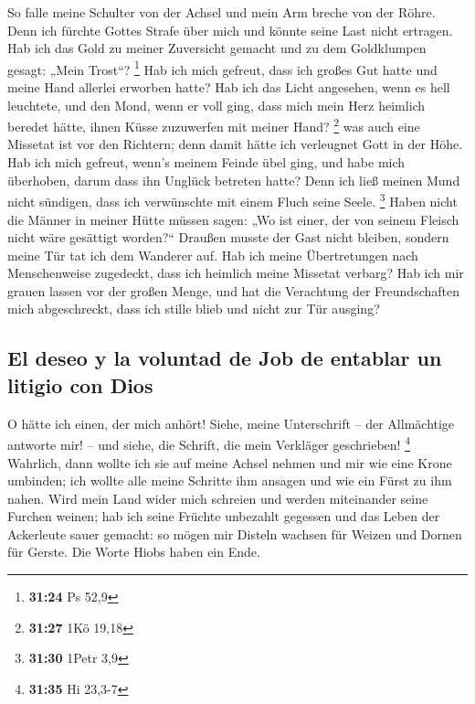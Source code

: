  So falle meine Schulter von der Achsel und mein Arm
breche von der Röhre.  Denn ich fürchte Gottes Strafe
über mich und könnte seine Last nicht ertragen.  Hab ich
das Gold zu meiner Zuversicht gemacht und zu dem Goldklumpen gesagt:
„Mein Trost``? \footnote{\textbf{31:24} Ps 52,9}  Hab ich
mich gefreut, dass ich großes Gut hatte und meine Hand allerlei erworben
hatte?  Hab ich das Licht angesehen, wenn es hell
leuchtete, und den Mond, wenn er voll ging,  dass mich
mein Herz heimlich beredet hätte, ihnen Küsse zuzuwerfen mit meiner
Hand? \footnote{\textbf{31:27} 1Kö 19,18}  was auch eine
Missetat ist vor den Richtern; denn damit hätte ich verleugnet Gott in
der Höhe.  Hab ich mich gefreut, wenn's meinem Feinde
übel ging, und habe mich überhoben, darum dass ihn Unglück betreten
hatte?  Denn ich ließ meinen Mund nicht sündigen, dass
ich verwünschte mit einem Fluch seine Seele. \footnote{\textbf{31:30}
  1Petr 3,9}  Haben nicht die Männer in meiner Hütte
müssen sagen: „Wo ist einer, der von seinem Fleisch nicht wäre gesättigt
worden?{}``  Draußen musste der Gast nicht bleiben,
sondern meine Tür tat ich dem Wanderer auf.  Hab ich
meine Übertretungen nach Menschenweise zugedeckt, dass ich heimlich
meine Missetat verbarg?  Hab ich mir grauen lassen vor
der großen Menge, und hat die Verachtung der Freundschaften mich
abgeschreckt, dass ich stille blieb und nicht zur Tür ausging?

\hypertarget{el-deseo-y-la-voluntad-de-job-de-entablar-un-litigio-con-dios}{%
\subsection{El deseo y la voluntad de Job de entablar un litigio con
Dios}\label{el-deseo-y-la-voluntad-de-job-de-entablar-un-litigio-con-dios}}

 O hätte ich einen, der mich anhört! Siehe, meine
Unterschrift -- der Allmächtige antworte mir! -- und siehe, die Schrift,
die mein Verkläger geschrieben! \footnote{\textbf{31:35} Hi 23,3-7}
 Wahrlich, dann wollte ich sie auf meine Achsel nehmen
und mir wie eine Krone umbinden;  ich wollte alle meine
Schritte ihm ansagen und wie ein Fürst zu ihm nahen. 
Wird mein Land wider mich schreien und werden miteinander seine Furchen
weinen;  hab ich seine Früchte unbezahlt gegessen und das
Leben der Ackerleute sauer gemacht:  so mögen mir Disteln
wachsen für Weizen und Dornen für Gerste. Die Worte Hiobs haben ein
Ende.

